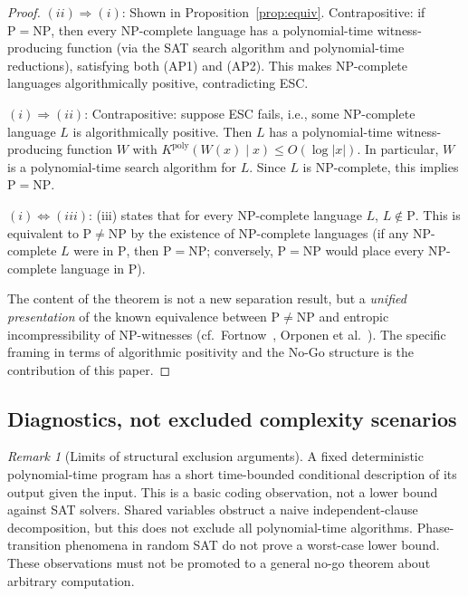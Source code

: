 \documentclass[aps,prd,twocolumn,superscriptaddress,nofootinbib]{revtex4-2}
\theoremstyle{definition}
\theoremstyle{remark}
\newtheorem{remark}[theorem]{Remark}
\DeclareMathOperator{\poly}{poly}
\newcommand{\NP}{\mathrm{NP}}
\newcommand{\PP}{\mathrm{P}}
\begin{document}
\begin{proof}
$(ii) \Rightarrow (i)$: Shown in Proposition~\ref{prop:equiv}. Contrapositive: if $\PP = \NP$, then every NP-complete language has a polynomial-time witness-producing function (via the SAT search algorithm and polynomial-time reductions), satisfying both (AP1) and (AP2). This makes NP-complete languages algorithmically positive, contradicting ESC.

$(i) \Rightarrow (ii)$: Contrapositive: suppose ESC fails, i.e., some NP-complete language $L$ is algorithmically positive. Then $L$ has a polynomial-time witness-producing function $W$ with $K^{\poly}(W(x) \mid x) \leq O(\log|x|)$. In particular, $W$ is a polynomial-time search algorithm for $L$. Since $L$ is NP-complete, this implies $\PP = \NP$.

$(i) \Leftrightarrow (iii)$: (iii) states that for every NP-complete language $L$, $L \notin \PP$. This is equivalent to $\PP \neq \NP$ by the existence of NP-complete languages (if any NP-complete $L$ were in $\PP$, then $\PP = \NP$; conversely, $\PP = \NP$ would place every NP-complete language in $\PP$).

The content of the theorem is not a new separation result, but a \textit{unified presentation} of the known equivalence between $\PP \neq \NP$ and entropic incompressibility of NP-witnesses (cf.\ Fortnow~\cite{Fortnow2000}, Orponen et al.~\cite{OrponenKoSchoeningWatanabe1994}). The specific framing in terms of algorithmic positivity and the No-Go structure is the contribution of this paper.
\end{proof}

\subsection{Diagnostics, not excluded complexity scenarios}
\begin{remark}[Limits of structural exclusion arguments]
\label{prop:excluded}
A fixed deterministic polynomial-time program has a short
time-bounded conditional description of its output given the
input. This is a basic coding observation, not a lower bound
against SAT solvers. Shared variables obstruct a naive
independent-clause decomposition, but this does not exclude
all polynomial-time algorithms. Phase-transition phenomena
in random SAT do not prove a worst-case lower bound.
These observations must not be promoted to a general
no-go theorem about arbitrary computation.
\end{remark}
\end{document}
